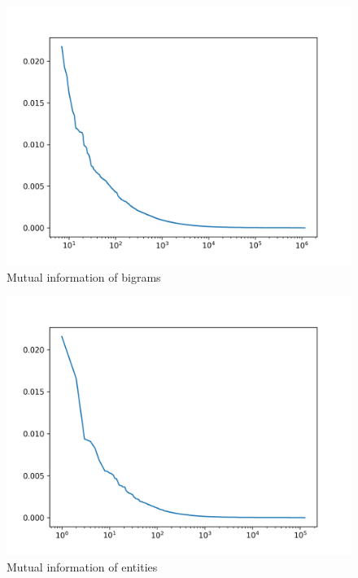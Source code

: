 \begin{figure}[ht]\centering
\includegraphics[width=130mm]{figures/bigrams.png}
\caption{Mutual information of bigrams}
\label{fig:mi_bigrams}
\end{figure}

\begin{figure}[ht]\centering
\includegraphics[width=130mm]{figures/entities.png}
\caption{Mutual information of entities}
\label{fig:mi_entities}
\end{figure}
